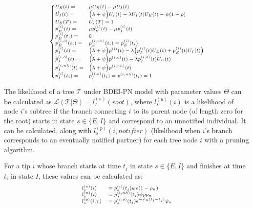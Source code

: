 \documentclass[a4paper,10pt]{article}
\begin{document}
\begin{equation}
\scriptsize
\begin{cases}
\dot{U_E}(t) = &\mu U_E(t)- \mu U_I(t)\\    
\dot{U_I}(t) = &\Big(\lambda + \psi\Big) U_I(t)- \lambda U_I(t)U_E(t)- \psi (1 - \rho)\\
U_E(T) = & U_I(T) = 1\\
\dot{p}_E^{(i)}(t) = & \mu p_E^{(i)}(t) - \mu p_I^{(i)}(t)\\
p_E^{(i)}(t_i) = & 0\\
p_E^{(i,o)}(t_i) = & p_E^{(i,nh)}(t_i) = p_E^{(i)}(t_i)\\
\dot{p}_I^{(i)}(t) = & \Big(\lambda + \psi\Big) p^{(i)}(t) - \lambda \Big(p_I^{(i)}(t)U_E(t) + p_E^{(i)}(t)U_I(t)\Big)\\
\dot{p}_I^{(i,o)}(t) = & \Big(\lambda + \psi\Big) p^{(i,o)}(t) - \lambda p_I^{(i,o)}(t)U_E(t)\\
\dot{p}_I^{(i,nh)}(t) = & \Big(\lambda + \psi\Big) p^{(i,nh)}(t)\\
p_I^{(i)}(t_i) = & p_I^{(i,o)}(t_i) = p^{(i,nh)}(t_i) = 1\label{eq:up-bd}
\end{cases}
\end{equation}

The likelihood of a tree $\mathscr{T}$ under BDEI-PN model with parameter values $\Theta$ can be calculated as $\mathscr{L}(\mathscr{T}|\Theta) = l_I^{(u)}(root)$, where $l_s^{(u)}(i)$ is a likelihood of node $i$'s subtree if the branch connecting $i$ to its parent node (of length zero for the root) starts in state $s \in \{E, I\}$ and correspond to an unnotified individual. It can be calculated, along with $l_s^{(p)}(i, notifier)$ (likelihood when $i$'s branch corresponds to an eventually notified partner) for each tree node $i$ with a pruning algorithm.


For a tip $i$ whose branch starts at time $t_j$ in state $s \in \{E, I\}$ and finishes at time $t_i$ in state $I$, these values can be calculated as:
\begin{equation}
\scriptsize
\begin{array}{ll}
l^{(u)}_{s}(i) &= p_s^{(i)}(t_j)\psi\rho (1-\rho_{n})\\
l^{(n)}_{s}(i) &= p_s^{(i,nh)}(t_j)\psi\rho \rho_{n}\\
l^{(p)}_{s}(i, r) &= p_s^{(r,o)}(t_j)e^{-\psi_n (t_i - t_j)}\psi_{n}\\
\end{array}
\end{equation}
\end{document}
